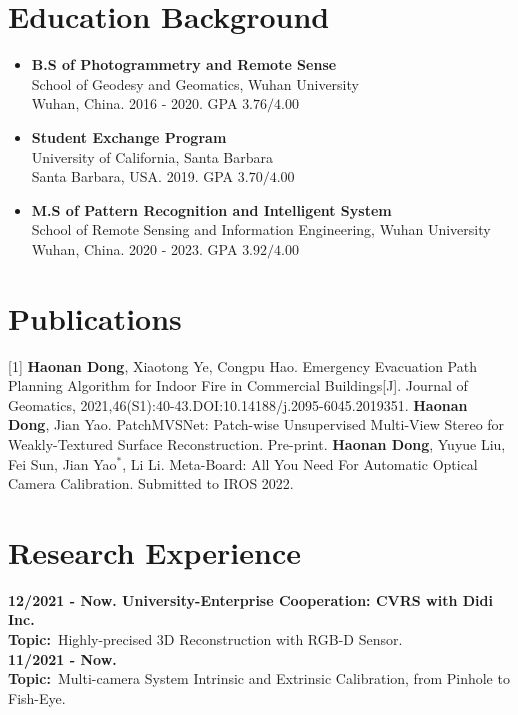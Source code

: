\documentclass[a4paper]{article}
\begin{document}
\section{Education Background}
\vspace{-0.5em}
\begin{itemize}[itemsep = -0.5em,topsep = 0em]
      \item \textbf{B.S of Photogrammetry and Remote Sense}
            \\ School of Geodesy and Geomatics, Wuhan University\\ Wuhan, China. 2016 - 2020. GPA $3.76/4.00$
      \item \textbf{Student Exchange Program}
            \\ University of California, Santa Barbara\\ Santa Barbara, USA. 2019. GPA $3.70/4.00$
      \item \textbf{M.S of Pattern Recognition and Intelligent System}
            \\ School of Remote Sensing and Information Engineering, Wuhan University\\ Wuhan, China. 2020 - 2023. GPA $3.92/4.00$
\end{itemize}


\section{Publications}
\vspace{-0.5em}
[1] \textbf{Haonan Dong}, Xiaotong Ye, Congpu Hao. Emergency Evacuation Path Planning Algorithm for Indoor Fire in Commercial Buildings[J]. Journal of Geomatics, 2021,46(S1):40-43.DOI:10.14188/j.2095-6045.2019351.
\newline
[2] \textbf{Haonan Dong}, Jian Yao. PatchMVSNet: Patch-wise Unsupervised Multi-View Stereo for
Weakly-Textured Surface Reconstruction. Pre-print.
\newline
[3] \textbf{Haonan Dong}, Yuyue Liu, Fei Sun, Jian Yao$^{*}$, Li Li. Meta-Board: All You Need For Automatic Optical Camera Calibration. Submitted to IROS 2022.


\section{Research Experience}
\vspace{-0.5em}
\textbf{12/2021 - Now. University-Enterprise Cooperation: CVRS with Didi Inc.}\\
\textbf{Topic:}\ Highly-precised 3D Reconstruction with RGB-D Sensor.\\
\textbf{11/2021 - Now.}\\
\textbf{Topic:}\ Multi-camera System Intrinsic and Extrinsic Calibration, from Pinhole to Fish-Eye.\\
\end{document}
